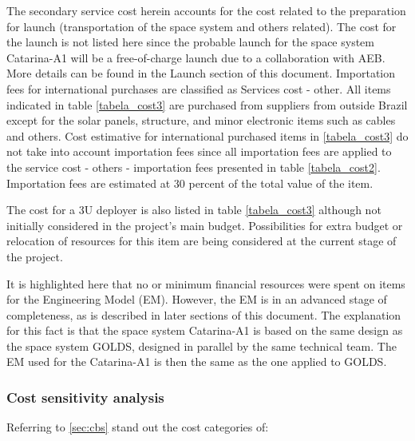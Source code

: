 The secondary service cost herein accounts for the cost related to the preparation for launch (transportation of the space system and others related). The cost for the launch is not listed here since the probable launch for the space system Catarina-A1 will be a free-of-charge launch due to a collaboration with AEB. More details can be found in the Launch section of this document.
Importation fees for international purchases are classified as Services cost - other. All items indicated in table \autoref{tabela_cost3} are purchased from suppliers from outside Brazil except for the solar panels, structure, and minor electronic items such as cables and others. Cost estimative for international purchased items in  \autoref{tabela_cost3} do not take into account importation fees since all importation fees are applied to the service cost - others - importation fees presented in table \autoref{tabela_cost2}. Importation fees are estimated at 30 percent of the total value of the item.

The cost for a 3U deployer is also listed in table \autoref{tabela_cost3} although not initially considered in the project's main budget. Possibilities for extra budget or relocation of resources for this item are being considered at the current stage of the project.

It is highlighted here that no or minimum financial resources were spent on items for the Engineering Model (EM). However, the EM is in an advanced stage of completeness, as is described in later sections of this document. The explanation for this fact is that the space system Catarina-A1 is based on the same design as the space system GOLDS, designed in parallel by the same technical team. The EM used for the Catarina-A1 is then the same as the one applied to GOLDS.


\subsubsection{Cost sensitivity analysis} \label{sec:cost_sensitivity_analysis}

Referring to \autoref{sec:cbs} stand out the cost categories of:

